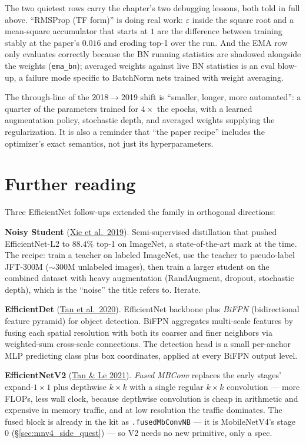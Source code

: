 The two quietest rows carry the chapter's two debugging lessons, both
told in full above. ``RMSProp (TF form)'' is doing real work:
$\varepsilon$ inside the square root and a mean-square accumulator that
starts at $1$ are the difference between training stably at the paper's
$0.016$ and eroding top-1 over the run. And the EMA row only evaluates
correctly because the BN running statistics are shadowed alongside the
weights (\texttt{ema\_bn}); averaged weights against live BN statistics
is an eval blow-up, a failure mode specific to BatchNorm nets trained
with weight averaging.

The through-line of the 2018$\to$2019 shift is ``smaller,
longer, more automated'': a quarter of the parameters trained for
$4\times$ the epochs, with a learned augmentation policy, stochastic
depth, and averaged weights supplying the regularization. It is also a
reminder that ``the paper recipe'' includes the optimizer's exact
semantics, not just its hyperparameters.

\section{Further reading}
\label{sec:enet_side_quests}

Three EfficientNet follow-ups extended the family in orthogonal
directions:

\textbf{Noisy Student}
(\href{https://arxiv.org/abs/1911.04252}{Xie et al.\ 2019}).
Semi-supervised distillation that pushed EfficientNet-L2 to
$88.4\%$ top-1 on ImageNet, a state-of-the-art mark at the time. The
recipe: train a teacher on labeled ImageNet, use the teacher to
pseudo-label JFT-300M ($\sim$300M unlabeled images), then train a
larger student on the combined dataset with heavy augmentation
(RandAugment, dropout, stochastic depth), which is the ``noise'' the
title refers to. Iterate.

\textbf{EfficientDet}
(\href{https://arxiv.org/abs/1911.09070}{Tan et al.\ 2020}).
EfficientNet backbone plus \emph{BiFPN} (bidirectional feature
pyramid) for object detection. BiFPN aggregates multi-scale
features by fusing each spatial resolution with both its coarser
and finer neighbors via weighted-sum cross-scale connections. The
detection head is a small per-anchor MLP predicting class plus box
coordinates, applied at every BiFPN output level.

\textbf{EfficientNetV2}
(\href{https://arxiv.org/abs/2104.00298}{Tan \& Le 2021}).
\emph{Fused MBConv} replaces the early stages' expand-$1\times1$ plus
depthwise $k\times k$ with a single regular $k\times k$ convolution ---
more FLOPs, less wall clock, because depthwise convolution is cheap in
arithmetic and expensive in memory traffic, and at low resolution the
traffic dominates. The fused block is already in
the kit as \texttt{.fusedMbConvNB} --- it is MobileNetV4's stage 0
(\S\ref{sec:mnv4_side_quest}) --- so V2 needs no new primitive, only a spec.


